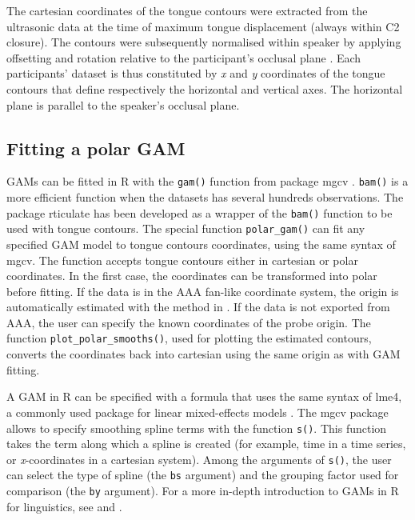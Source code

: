 \documentclass[12pt,]{article}
\begin{document}
The cartesian coordinates of the tongue contours were extracted from the
ultrasonic data at the time of maximum tongue displacement (always
within C2 closure). The contours were subsequently normalised within
speaker by applying offsetting and rotation relative to the
participant's occlusal plane \citep{scobbie2011}. Each participants'
dataset is thus constituted by \emph{x} and \emph{y} coordinates of the
tongue contours that define respectively the horizontal and vertical
axes. The horizontal plane is parallel to the speaker's occlusal plane.

\hypertarget{fitting-a-polar-gam}{%
\subsection{Fitting a polar GAM}\label{fitting-a-polar-gam}}

GAMs can be fitted in R with the \texttt{gam()} function from package
mgcv \citep{wood2011, wood2017}. \texttt{bam()} is a more efficient
function when the datasets has several hundreds observations. The
package rticulate has been developed as a wrapper of the \texttt{bam()}
function to be used with tongue contours. The special function
\texttt{polar\_gam()} can fit any specified GAM model to tongue contours
coordinates, using the same syntax of mgcv. The function accepts tongue
contours either in cartesian or polar coordinates. In the first case,
the coordinates can be transformed into polar before fitting. If the
data is in the AAA fan-like coordinate system, the origin is
automatically estimated with the method in \citet{heyne2015a}. If the
data is not exported from AAA, the user can specify the known
coordinates of the probe origin. The function
\texttt{plot\_polar\_smooths()}, used for plotting the estimated
contours, converts the coordinates back into cartesian using the same
origin as with GAM fitting.

A GAM in R can be specified with a formula that uses the same syntax of
lme4, a commonly used package for linear mixed-effects models
\citep{bates2015}. The mgcv package allows to specify smoothing spline
terms with the function \texttt{s()}. This function takes the term along
which a spline is created (for example, time in a time series, or
\emph{x}-coordinates in a cartesian system). Among the arguments of
\texttt{s()}, the user can select the type of spline (the \texttt{bs}
argument) and the grouping factor used for comparison (the \texttt{by}
argument). For a more in-depth introduction to GAMs in R for
linguistics, see \citet{soskuthy2017} and \citet{wieling2017}.
\end{document}
